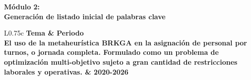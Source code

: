 \begin{center}
  \Large
  {\color{colorA}
  \textbf{Módulo 2:\\ Generación de listado inicial de palabras clave}}
\end{center}
\begin{flushleft}
  {\small {}
  }
\end{flushleft}

\begin{table}[ht!]
  \centering
  \def\arraystretch{1.8}
  \caption{Acotación del tema y el periodo.}
  \begin{tabular}{L{0.75\textwidth}c}
    \toprule
    \bfseries Tema & \bfseries Periodo \\ \hline
    El uso de la metaheurística BRKGA en la asignación de personal
    por turnos, o jornada completa. Formulado como un problema de optimización multi-objetivo sujeto a gran cantidad de restricciones laborales y operativas.
    & 2020-2026 \\
    \bottomrule
  \end{tabular}
\end{table}
\clearpage

